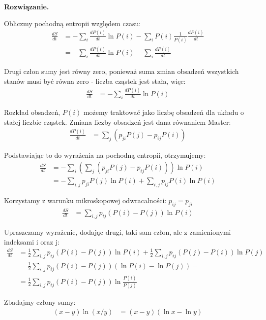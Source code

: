 \documentclass[11pt,a4paper]{article}
\newenvironment{solution}{\vspace{1cm} \par\textbf{Rozwiązanie.} \vspace{1cm}}{}
\begin{document}
\begin{solution}
  
Obliczmy pochodną entropii względem czasu:
\begin{align*}
  \frac{dS}{dt} &= -\sum_i \frac{dP(i)}{dt} \ln P(i) - \sum_i P(i) \frac{1}{P(i)} \frac{dP(i)}{dt} \\
  &= -\sum_i \frac{dP(i)}{dt} \ln P(i) - \sum_i \frac{dP(i)}{dt}
\end{align*}

Drugi człon sumy jest równy zero, 
ponieważ suma zmian obsadzeń wszystkich stanów musi być równa zero -
liczba cząstek jest stała, więc:
\begin{align*}
  \frac{dS}{dt} &= -\sum_i \frac{dP(i)}{dt} \ln P(i)
\end{align*}

Rozkład obsadzeń, $P(i)$ możemy traktować jako 
liczbę obsadzeń dla układu o stałej liczbie cząstek.
Zmiana liczby obsadzeń jest dana równaniem Master:
\begin{align*}
  \frac{dP(i)}{dt} &= \sum_j (p_{ji} P(j) - p_{ij} P(i))
\end{align*}

Podstawiając to do wyrażenia na pochodną entropii, otrzymujemy:
\begin{align*}
  \frac{dS}{dt} &= -\sum_i \left( \sum_j (p_{ji} P(j) - p_{ij} P(i)) \right) \ln P(i) \\
  &= -\sum_{i,j} p_{ji} P(j) \ln P(i) + \sum_{i,j} p_{ij} P(i) \ln P(i)
\end{align*}

Korzystamy z warunku mikroskopowej odwracalności: $p_{ij} = p_{ji}$
\begin{align*}
  \frac{dS}{dt} &= \sum_{i,j} p_{ij} (P(i) - P(j)) \ln P(i)
\end{align*}

Upraszczamy wyrażenie, dodając drugi, taki sam człon, 
ale z zamienionymi indeksami i oraz j:
\begin{align*}
  \frac{dS}{dt} &= \frac{1}{2} \sum_{i,j} p_{ij} (P(i) - P(j)) \ln P(i) + \frac{1}{2} \sum_{i,j} p_{ij} (P(j) - P(i)) \ln P(j) \\
  &= \frac{1}{2} \sum_{i,j} p_{ij} (P(i) - P(j)) (\ln P(i) - \ln P(j)) = \\
  &= \frac{1}{2} \sum_{i,j} p_{ij} (P(i) - P(j)) \ln \frac{P(i)}{P(j)}
\end{align*}

Zbadajmy człony sumy:
\begin{align*}
  (x-y)\ln(x/y) &= (x-y)(\ln x - \ln y) \\
\end{align*}


\end{solution}
\end{document}
